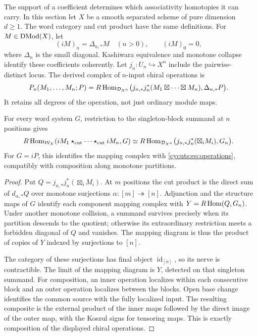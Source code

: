 The support of a coefficient determines which associativity homotopies
it can carry. In this section let $X$ be a smooth separated scheme
of pure dimension $d\ge1$. The word category and cut product have
the same definitions. For $M\in\operatorname{DMod}(X)$, let
\[
 (iM)_n=\Delta_{n,*}M\quad(n>0),\qquad(iM)_0=0,
\]
where $\Delta_n$ is the small diagonal. Kashiwara equivalence and
monotone collapse identify these coefficients coherently.
Let $j_n:U_n\hookrightarrow X^n$ include the pairwise-distinct locus.
The derived complex of $n$-input chiral operations is
\begin{equation}\label{cycuts:eq:operations}
 P_n(M_1,\ldots,M_n;P)=
 R\operatorname{Hom}_{\mathcal D_{X^n}}
 \bigl(j_{n,*}j_n^*(M_1\boxtimes\cdots\boxtimes M_n),
                                  \Delta_{n,*}P\bigr).
\end{equation}
It retains all degrees of the operation, not just ordinary module maps.

\begin{proposition}\label{cycuts:prop:operations}
For every word system $G$, restriction to the singleton-block summand
at $n$ positions gives
\[
 R\operatorname{Hom}_{\mathcal W_X}(iM_1\star_{\mathrm{cut}}\cdots\star_{\mathrm{cut}} iM_n,G)
 \simeq R\operatorname{Hom}_{\mathcal D_{X^n}}
 \bigl(j_{n,*}j_n^*(\boxtimes_iM_i),G_n\bigr).
\]
For $G=iP$, this identifies the mapping complex with
\eqref{cycuts:eq:operations}, compatibly with composition along
monotone partitions.
\end{proposition}
\begin{proof}
Put $Q=j_{n,*}j_n^*(\boxtimes_iM_i)$. At $m$ positions the cut
product is the direct sum of $d_{\alpha,*}Q$ over monotone
surjections $\alpha:[m]\twoheadrightarrow[n]$. Adjunction and
the structure maps of $G$ identify each component mapping complex
with $Y=R\operatorname{Hom}(Q,G_n)$. Under another monotone collision, a summand
survives precisely when its partition descends to the quotient;
otherwise its extraordinary restriction meets a forbidden diagonal
of $Q$ and vanishes. The mapping diagram is thus the product of
copies of $Y$ indexed by surjections to $[n]$.

The category of these surjections has final object
$\operatorname{id}_{[n]}$, so its nerve is contractible. The limit
of the mapping diagram is $Y$, detected on that singleton summand.
For composition, an inner operation localizes within each consecutive
block and an outer operation localizes between the blocks. Open
base change identifies the common source with the fully localized
input. The resulting composite is the external product of the
inner maps followed by the direct image of the outer map, with
the Koszul signs for tensoring maps. This is exactly composition
of the displayed chiral operations.
\end{proof}

